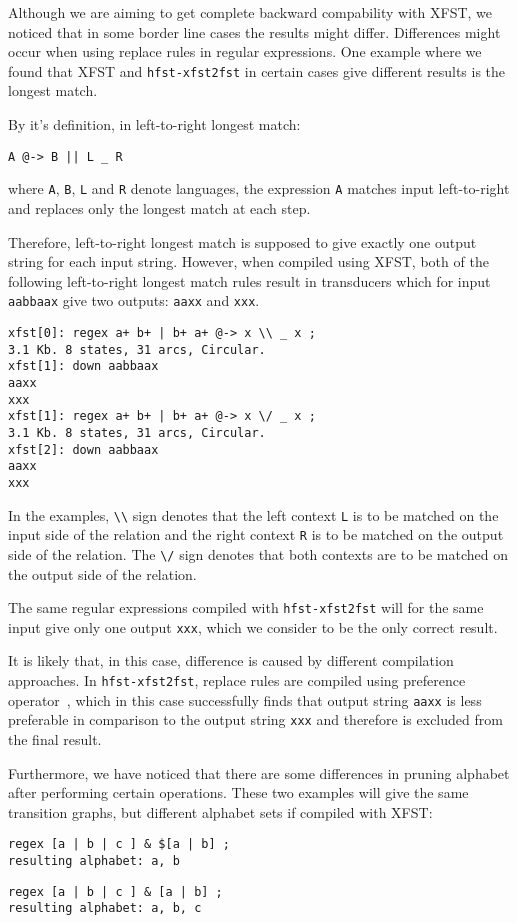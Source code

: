 \documentclass{llncs}
\begin{document}
Although we are aiming to get complete backward compability with XFST, we
noticed that in some border line cases the results might differ. Differences
might occur when using replace rules in regular expressions.
One example where we found that XFST and \verb+hfst-xfst2fst+ in certain cases
give different results is the longest match.


By it's definition, in left-to-right longest match: 
\begin{verbatim}
A @-> B || L _ R
\end{verbatim}
where \verb+A+, \verb+B+, \verb+L+ and \verb+R+ denote languages, the
expression \verb+A+ matches input left-to-right and replaces only the longest
match at each step.

Therefore, left-to-right longest match is supposed to give exactly one output
string for each input string. However, when compiled using XFST, both of the following left-to-right
longest match rules result in transducers which for input \verb+aabbaax+ give two outputs: \verb+aaxx+ and \verb+xxx+.
\begin{verbatim}
xfst[0]: regex a+ b+ | b+ a+ @-> x \\ _ x ;
3.1 Kb. 8 states, 31 arcs, Circular.
xfst[1]: down aabbaax
aaxx
xxx
xfst[1]: regex a+ b+ | b+ a+ @-> x \/ _ x ;
3.1 Kb. 8 states, 31 arcs, Circular.
xfst[2]: down aabbaax
aaxx
xxx
\end{verbatim}

In the examples, \verb+\\+ sign denotes that the left context \verb+L+ is to be
matched on the input side of the relation and the right context \verb+R+ is to
be matched on the output side of the relation. The \verb+\/+ sign denotes
that both contexts are to be matched on the output side of the relation.

The same regular expressions compiled with \verb+hfst-xfst2fst+ will for the same
input give only one output \verb+xxx+, which we consider to be the only correct
result.

It is likely that, in this case, difference is caused by different compilation approaches.
In \verb+hfst-xfst2fst+, replace rules are compiled using preference
operator~\cite{drobac/2012}, which in this case successfully finds that output string
\verb+aaxx+ is less preferable in comparison to the output string \verb+xxx+ and therefore is excluded from the final result.



Furthermore, we have noticed that there are some differences in pruning alphabet
after performing certain operations.
These two examples will give the same transition graphs, but different alphabet
sets if compiled with XFST:
\begin{verbatim}
regex [a | b | c ] & $[a | b] ;
resulting alphabet: a, b
\end{verbatim}
\begin{verbatim}
regex [a | b | c ] & [a | b] ;
resulting alphabet: a, b, c
\end{verbatim}
\end{document}
